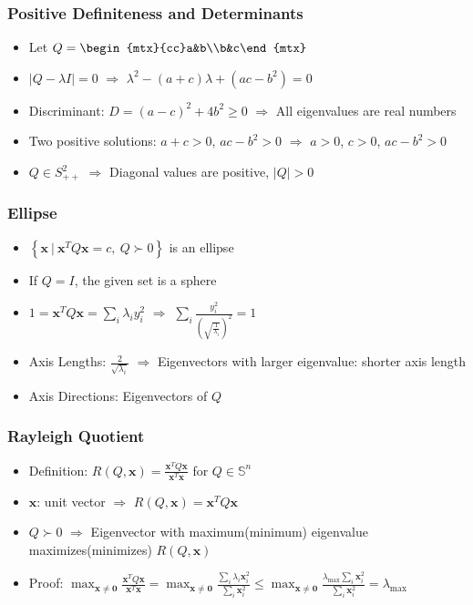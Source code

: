 \subsubsection*{Positive Definiteness and Determinants}
\begin{itemize}
    \item Let $Q = \begin{mtx}{cc}a&b\\b&c\end{mtx}$
    \item $|Q - \lambda I| = 0$ $\Rightarrow$ $\lambda^2 - (a + c)\lambda + \left( ac - b^2 \right) = 0$
    \item Discriminant: $D = (a - c)^2 + 4b^2 \geq 0$ $\Rightarrow$ All eigenvalues are real numbers
    \item Two positive solutions: $a + c > 0$, $ac - b^2 > 0$ $\Rightarrow$ $a > 0$, $c > 0$, $ac - b^2 > 0$
    \item $Q \in S_{++}^2$ $\Rightarrow$ Diagonal values are positive, $|Q| > 0$
\end{itemize}

\subsubsection*{Ellipse}
\begin{itemize}
    \item $\left\{\mathbf{x}~|~\mathbf{x}^TQ\mathbf{x}=c,~Q \succ 0\right\}$ is an ellipse
    \item If $Q = I$, the given set is a sphere
    \item $1 = \mathbf{x}^T Q\mathbf{x} = \sum_i \lambda_i y_i^2$ $\Rightarrow$
        $\sum_i \frac {y_i^2} {\left( \sqrt{\frac 1 {\lambda_i}} \right)^2} = 1$
    \item Axis Lengths: $\frac 2 {\sqrt {\lambda_i}}$ $\Rightarrow$ Eigenvectors with larger eigenvalue: shorter axis length
    \item Axis Directions: Eigenvectors of $Q$
\end{itemize}

\subsubsection*{Rayleigh Quotient}
\begin{itemize}
    \item Definition: $R(Q, \mathbf{x}) = \frac {\mathbf{x}^T Q\mathbf{x}} {\mathbf{x}^T\mathbf{x}}$ for $Q \in \mathbb{S}^n$
    \item $\mathbf{x}$: unit vector $\Rightarrow$ $R(Q, \mathbf{x}) = \mathbf{x}^TQ\mathbf{x}$
    \item $Q \succ 0$ $\Rightarrow$ Eigenvector with maximum(minimum) eigenvalue maximizes(minimizes) $R(Q, \mathbf{x})$
    \item Proof: $\max_{\mathbf{x} \neq \mathbf{0}} \frac {\mathbf{x}^T Q\mathbf{x}} {\mathbf{x}^T\mathbf{x}}
        = \max_{\mathbf{x} \neq \mathbf{0}} \frac {\sum_i \lambda_i \mathbf{x}_i^2} {\sum_i \mathbf{x}_i^2}
        \leq \max_{\mathbf{x} \neq \mathbf{0}} \frac {\lambda_{\mathrm{max}}\sum_i \mathbf{x}_i^2} {\sum_i \mathbf{x}_i^2}
        = \lambda_{\mathrm{max}}$
\end{itemize}
